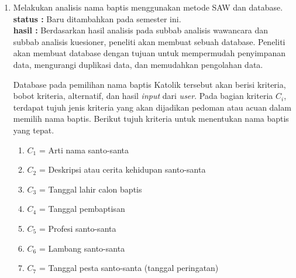 \documentclass[a4paper,twoside]{article}
\begin{document}
\begin{enumerate}
\item Melakukan analisis nama baptis menggunakan metode SAW dan database.\\
		{\bf status :} Baru ditambahkan pada semester ini.\\
		{\bf hasil :} Berdasarkan hasil analisis pada subbab analisis wawancara dan subbab analisis kuesioner, peneliti akan membuat sebuah database. Peneliti akan membuat database dengan tujuan untuk mempermudah penyimpanan data, mengurangi duplikasi data, dan memudahkan pengolahan data. 

Database pada pemilihan nama baptis Katolik tersebut akan berisi kriteria, bobot kriteria, alternatif, dan hasil \textit{input} dari \textit{user}. %
Pada bagian kriteria $C_{i}$, terdapat tujuh jenis kriteria yang akan dijadikan pedoman atau acuan dalam memilih nama baptis. Berikut tujuh kriteria untuk menentukan nama baptis yang tepat.
\begin{enumerate}
	\item $C_{1}$ = Arti nama santo-santa
	\item $C_{2}$ = Deskripsi atau cerita kehidupan santo-santa
	\item $C_{3}$ = Tanggal lahir calon baptis
	\item $C_{4}$ = Tanggal pembaptisan
	\item $C_{5}$ = Profesi santo-santa
	\item $C_{6}$ = Lambang santo-santa
	\item $C_{7}$ = Tanggal pesta santo-santa (tanggal peringatan)
\end{enumerate}


\end{enumerate}
\end{document}
